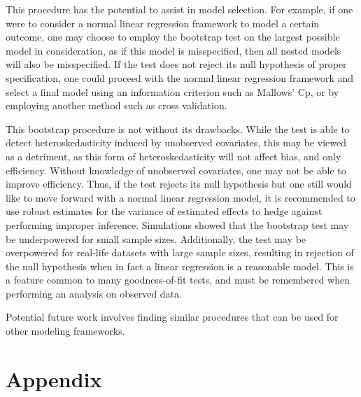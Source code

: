 \documentclass[12pt]{article} %
\theoremstyle{definition}
\begin{document}
This procedure has the potential to assist in model selection. For example, if one were to consider a normal linear regression framework to model a certain outcome, one may
choose to employ the bootstrap test on the largest possible model in consideration, as if this model is misspecified, then all nested models will also be misspecified.
If the test does not reject its null hypothesis of proper specification, one could proceed with the normal linear regression framework and select a final model using
an information criterion such as Mallows' Cp, or by employing another method such as cross validation.

This bootstrap procedure is not without its drawbacks. While the test is able to detect heteroskedasticity induced by unobserved covariates, this may be viewed as a detriment,
as this form of heteroskedasticity will not affect bias, and only efficiency. Without knowledge of unobserved covariates, one may not be able to improve efficiency. Thus, if the test rejects its
null hypothesis but one still would like  to move forward with a normal linear regression model, it is recommended to use robust estimates for the variance of estimated effects
to hedge against performing improper inference. Simulations showed that the bootstrap test may be underpowered for small sample sizes. Additionally, the test may be overpowered for real-life datasets with large sample sizes, resulting in rejection of the null hypothesis
when in fact a linear regression is a reasonable model. This is a feature common to many goodness-of-fit tests, and must be remembered when performing an analysis on observed data.

Potential future work involves finding similar procedures that can be used for other modeling frameworks.



\section*{Appendix}
\end{document}
